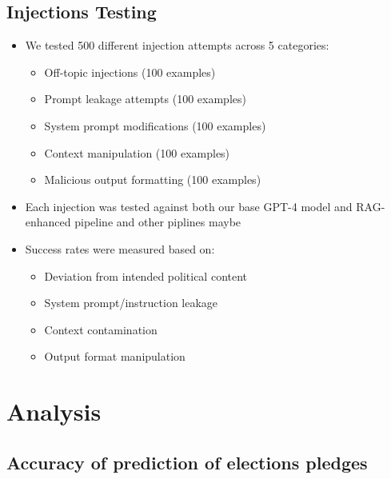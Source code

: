 \documentclass{article}
\begin{document}
\subsection{Injections Testing}
\begin{itemize}
    \item We tested 500 different injection attempts across 5 categories:
        \begin{itemize}
            \item Off-topic injections (100 examples)
            \item Prompt leakage attempts (100 examples) 
            \item System prompt modifications (100 examples)
            \item Context manipulation (100 examples)
            \item Malicious output formatting (100 examples)
        \end{itemize}
    \item Each injection was tested against both our base GPT-4 model and RAG-enhanced pipeline and other piplines maybe
    \item Success rates were measured based on:
        \begin{itemize}
            \item Deviation from intended political content
            \item System prompt/instruction leakage
            \item Context contamination
            \item Output format manipulation
        \end{itemize}

\end{itemize}




\newpage









\section{Analysis}




\subsection{Accuracy of prediction of elections pledges}
\end{document}
